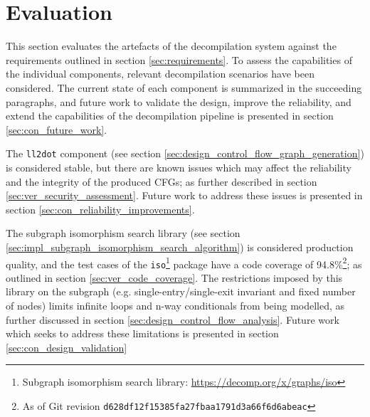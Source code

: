 
%

%
%

\section{Evaluation}
\label{sec:evaluation}

This section evaluates the artefacts of the decompilation system against the requirements outlined in section \ref{sec:requirements}. To assess the capabilities of the individual components, relevant decompilation scenarios have been considered. The current state of each component is summarized in the succeeding paragraphs, and future work to validate the design, improve the reliability, and extend the capabilities of the decompilation pipeline is presented in section \ref{sec:con_future_work}.

The \texttt{ll2dot} component (see section \ref{sec:design_control_flow_graph_generation}) is considered stable, but there are known issues which may affect the reliability and the integrity of the produced CFGs; as further described in section \ref{sec:ver_security_assessment}. Future work to address these issues is presented in section \ref{sec:con_reliability_improvements}.

The subgraph isomorphism search library (see section \ref{sec:impl_subgraph_isomorphism_search_algorithm}) is considered production quality, and the test cases of the \texttt{iso}\footnote{Subgraph isomorphism search library: \url{https://decomp.org/x/graphs/iso}} package have a code coverage of 94.8\%\footnote{As of Git revision \texttt{d628df12f15385fa27fbaa1791d3a66f6d6abeac}}; as outlined in section \ref{sec:ver_code_coverage}. The restrictions imposed by this library on the subgraph (e.g. single-entry/single-exit invariant and fixed number of nodes) limits infinite loops and n-way conditionals from being modelled, as further discussed in section \ref{sec:design_control_flow_analysis}. Future work which seeks to address these limitations is presented in section \ref{sec:con_design_validation}

